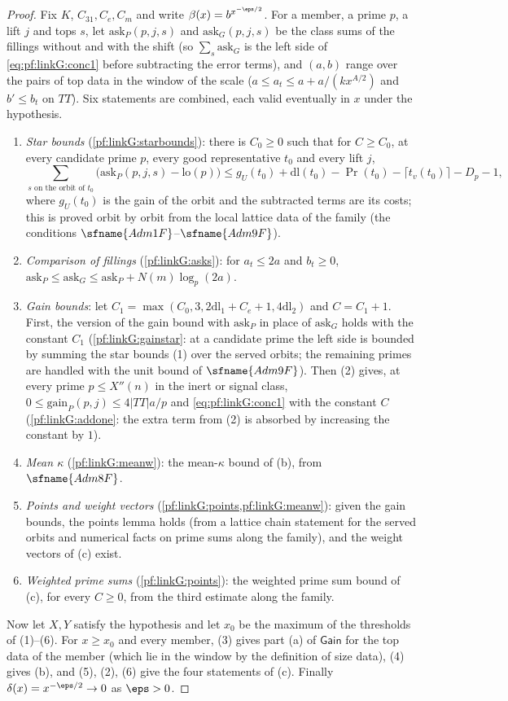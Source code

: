 \begin{proof}
Fix $K$, $C_{31},C_e,C_m$ and write $\beta(x)=b^{x^{-\eps/2}}$. For a member, a prime $p$, a lift $j$ and tops $s$, let
$\mathrm{ask}_P(p,j,s)$ and $\mathrm{ask}_G(p,j,s)$ be the class sums of the fillings without and with the shift (so
$\sum_s\mathrm{ask}_G$ is the left side of \eqref{eq:pf:linkG:conc1} before subtracting the error terms), and $(a,b)$ range over
the pairs of top data in the window of the scale ($a\le a_t\le a+a/(kx^{A/2})$ and $b'\le b_t$ on $TT$). Six statements are
combined, each valid eventually in $x$ under the hypothesis.
\begin{enumerate}[label=(\arabic*)]
\item \emph{Star bounds} (\cref{pf:linkG:starbounds}): there is $C_0\ge0$ such that for $C\ge C_0$,
at every candidate prime $p$, every good representative $t_0$ and every lift $j$,
\[
\sum_{s\text{ on the orbit of }t_0}\bigl(\mathrm{ask}_P(p,j,s)-\mathrm{lo}(p)\bigr)\le g_U(t_0)+\mathrm{dl}(t_0)-\Pr(t_0)-\lceil
t_v(t_0)\rceil-D_p-1,
\]
where $g_U(t_0)$ is the gain of the orbit and the subtracted terms are its costs; this is proved orbit by orbit from the
local lattice data of the family (the conditions $\sfname{Adm1F}$--$\sfname{Adm9F}$).
\item \emph{Comparison of fillings} (\cref{pf:linkG:asks}): for $a_t\le2a$ and $b_t\ge0$,
$\mathrm{ask}_P\le\mathrm{ask}_G\le\mathrm{ask}_P+N(m)\log_p(2a)$.
\item \emph{Gain bounds}: let $C_1=\max(C_0,3,2\mathrm{dl}_1+C_e+1,4\mathrm{dl}_2)$ and $C=C_1+1$. First, the version of the gain
bound with $\mathrm{ask}_P$ in place of $\mathrm{ask}_G$ holds with the constant $C_1$
(\cref{pf:linkG:gainstar}: at a candidate prime the left side is bounded by summing
the star bounds (1) over the served orbits; the remaining primes are handled with the unit bound of $\sfname{Adm9F}$). Then
(2) gives, at every prime $p\le X''(n)$ in the inert or signal class, $0\le\mathrm{gain}_P(p,j)\le4|TT|a/p$ and
\eqref{eq:pf:linkG:conc1} with the constant $C$
(\cref{pf:linkG:addone}: the extra term from (2) is
absorbed by increasing the constant by $1$).
\item \emph{Mean $\kappa$} (\cref{pf:linkG:meanw}): the mean-$\kappa$ bound of (b), from
$\sfname{Adm8F}$.
\item \emph{Points and weight vectors}
(\cref{pf:linkG:points,pf:linkG:meanw}): given the gain bounds,
the points lemma holds (from a lattice chain statement for the served orbits and numerical facts on prime sums along the
family), and the weight vectors of (c) exist.
\item \emph{Weighted prime sums} (\cref{pf:linkG:points}): the weighted prime sum bound of (c),
for every $C\ge0$, from the third estimate along the family.
\end{enumerate}
Now let $X,Y$ satisfy the hypothesis and let $x_0$ be the maximum of the thresholds of (1)--(6). For $x\ge x_0$ and every
member, (3) gives part (a) of $\mathsf{Gain}$ for the top data of the member (which lie in the window by the definition of
size data), (4) gives (b), and (5), (2), (6) give the four statements of (c). Finally $\delta(x)=x^{-\eps/2}\to0$ as $\eps>0$.
\end{proof}

